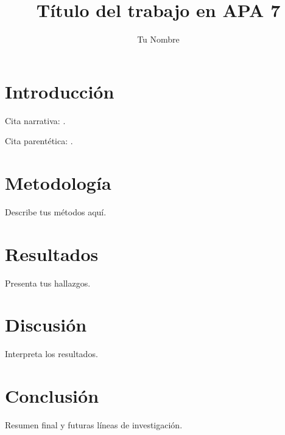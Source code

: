 \documentclass[man]{apa7}  %
\title{Título del trabajo en APA 7}
\author{Tu Nombre}
\affiliation{Tu Universidad}
\begin{document}
	
	\maketitle
	
	\section{Introducción}
	
	Cita narrativa: \textcite{einstein1905}.
	
	Cita parentética: \parencite{einstein1905}.
	
	\section{Metodología}
	Describe tus métodos aquí.
	
	\section{Resultados}
	Presenta tus hallazgos.
	
	\section{Discusión}
	Interpreta los resultados.
	
	\section{Conclusión}
	Resumen final y futuras líneas de investigación.
	
	\printbibliography
	
\end{document}
